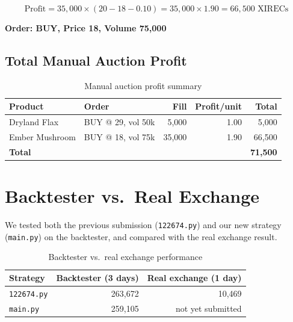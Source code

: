 \documentclass[11pt,a4paper]{article}
\begin{document}
\begin{equation}
\text{Profit} = 35{,}000 \times (20 - 18 - 0.10) = 35{,}000 \times 1.90 = \boxed{66{,}500 \text{ XIRECs}}
\end{equation}

\textbf{Order: BUY, Price 18, Volume 75,000}

\subsection{Total Manual Auction Profit}

\begin{table}[H]
\centering
\caption{Manual auction profit summary}
\begin{tabular}{@{}llrrr@{}}
\toprule
\textbf{Product} & \textbf{Order} & \textbf{Fill} & \textbf{Profit/unit} & \textbf{Total} \\
\midrule
Dryland Flax    & BUY @ 29, vol 50k & 5,000  & 1.00 & 5,000 \\
Ember Mushroom  & BUY @ 18, vol 75k & 35,000 & 1.90 & 66,500 \\
\midrule
\textbf{Total}  & & & & \textbf{71,500} \\
\bottomrule
\end{tabular}
\end{table}

\section{Backtester vs.\ Real Exchange}

We tested both the previous submission (\texttt{122674.py}) and our new strategy (\texttt{main.py}) on the backtester, and compared with the real exchange result.

\begin{table}[H]
\centering
\caption{Backtester vs.\ real exchange performance}
\begin{tabular}{@{}lrr@{}}
\toprule
\textbf{Strategy} & \textbf{Backtester (3 days)} & \textbf{Real exchange (1 day)} \\
\midrule
\texttt{122674.py} & 263,672 & 10,469 \\
\texttt{main.py}   & 259,105 & not yet submitted \\
\bottomrule
\end{tabular}
\end{table}
\end{document}
